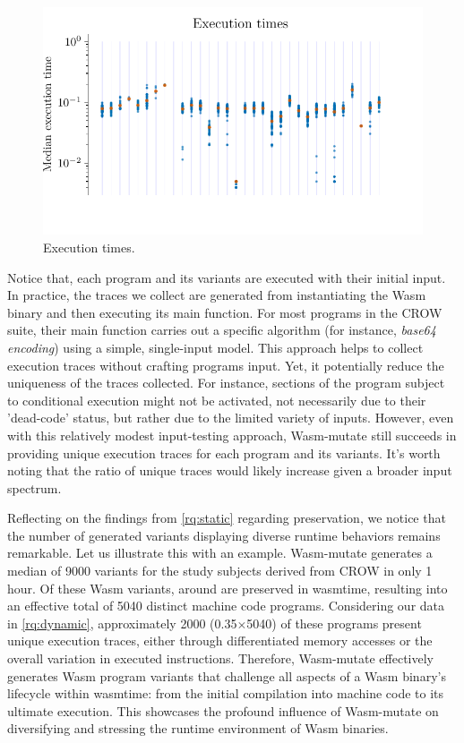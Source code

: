 \documentclass[sigplan,screen]{acmart}
\newcommand{\tool}{Wasm-mutate\xspace}
\newcommand{\wasm}{Wasm\xspace}
\begin{document}
\begin{figure}
    \centering
    \includegraphics[width=\linewidth]{plots/rq2/times.pdf}
    \caption{Execution times.}
  \label{rq2:plot:execution_times}
\end{figure}

Notice that, each program and its variants are executed with their initial input.
In practice, the traces we collect are generated from instantiating the \wasm binary and then executing its main function. 
For most programs in the CROW suite, their main function carries out a specific algorithm (for instance, \emph{base64 encoding}) using a simple, single-input model. 
This approach helps to collect execution traces without crafting programs input.
Yet, it potentially reduce the uniqueness of the traces collected. 
For instance, sections of the program subject to conditional execution might not be activated, not necessarily due to their 'dead-code' status, but rather due to the limited variety of inputs. 
However, even with this relatively modest input-testing approach, \tool still succeeds in providing unique execution traces for each program and its variants.
It's worth noting that the ratio of unique traces would likely increase given a broader input spectrum.

Reflecting on the findings from \ref{rq:static} regarding preservation, we notice that the number of generated variants displaying diverse runtime behaviors remains remarkable. 
Let us illustrate this with an example.
\tool generates a median of 9000 variants for the study subjects derived from CROW in only 1 hour. 
Of these \wasm variants, around \preserved are preserved in wasmtime, resulting into an effective total of 5040 distinct machine code programs.
Considering our data in \ref{rq:dynamic}, approximately 2000 (0.35$\times$5040) of these programs present unique execution traces, either through differentiated memory accesses or the overall variation in executed instructions. 
Therefore, \tool effectively generates \wasm program variants that challenge all aspects of a \wasm binary's lifecycle within wasmtime: from the initial compilation into machine code to its ultimate execution. 
This showcases the profound influence of \tool on diversifying and stressing the runtime environment of \wasm binaries.
\end{document}
